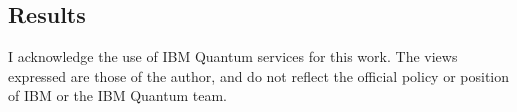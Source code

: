 \documentclass[prx,twocolumn]{revtex4-2}
\numberwithin{equation}{section}
\numberwithin{figure}{section}
\numberwithin{table}{section}
\begin{document}
\subsection{Results}

\nocite{ibm-quantum}

\begin{acknowledgments}
    I acknowledge the use of IBM Quantum services for this work. The views expressed are those of the author, 
    and do not reflect the official policy or position of IBM or the IBM Quantum team.
\end{acknowledgments}


\end{document}
